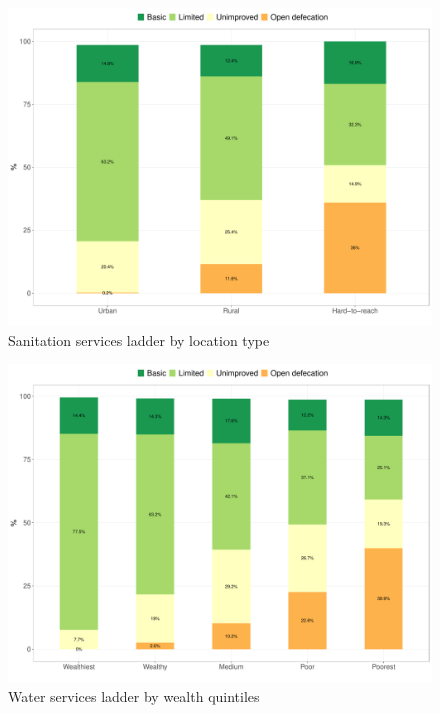 \documentclass[12pt,a4paper]{article}
\begin{document}
\newpage

\begin{figure}[H]

{\centering \includegraphics{kayinReport_files/figure-latex/san1plot-1} 

}

\caption{Sanitation services ladder by location type}\label{fig:san1plot}
\end{figure}

\begin{figure}[H]

{\centering \includegraphics{kayinReport_files/figure-latex/san2plot-1} 

}

\caption{Water services ladder by wealth quintiles}\label{fig:san2plot}
\end{figure}
\end{document}
